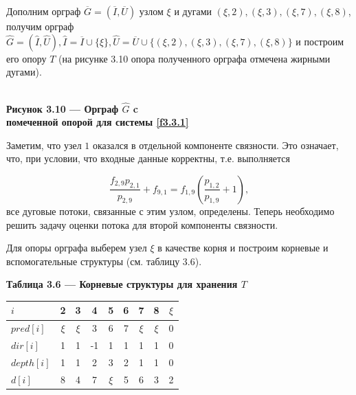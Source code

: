 \documentclass[14pt]{extarticle}%
\begin{document}
Дополним орграф $\overline{G}=(\overline{I},\overline{U})$ узлом $\xi$ и дугами $(\xi,2), (\xi,3), (\xi,7), (\xi,8)$, получим орграф $\widehat{G}=(\widehat{I}, \widehat{U}), \widehat{I}=\overline{I}\cup \{\xi\}, \widehat{U}=\overline{U}\cup \{(\xi,2), (\xi,3), (\xi,7), (\xi,8)\}$ и построим его опору $T$ (на рисунке 3.10 опора полученного орграфа отмечена жирными дугами).

\begin{center}
\\
\textbf{Рисунок 3.10 --- Орграф $\widehat{G}$ c\\помеченной опорой для системы \eqref{f3.3.1}}
\end{center}

Заметим, что узел $1$ оказался в отдельной компоненте связности. Это означает, что, при условии, что входные данные корректны, т.е. выполняется

$$
\frac{f_{2,9} p_{2,1}}{p_{2,9}}+f_{9,1}=f_{1,9} \left(\frac{p_{1,2}}{p_{1,9}}+1\right),
$$
все дуговые потоки, связанные с этим узлом, определены. Теперь необходимо решить задачу оценки потока для второй компоненты связности.

Для опоры орграфа выберем узел $\xi$ в качестве корня и построим корневые и вспомогательные структуры (см. таблицу 3.6).

\begin{center}
\textbf{Таблица 3.6 --- Корневые структуры для хранения $T$}\\
\begin{tabular}{l|cccccccc}
 $i$ &2&3&4&5&6&7&8&$\xi$\\\hline
 $pred[i]$ & $\xi$ & $\xi$ & 3 & 6 & 7 & $\xi$ & $\xi$ & 0 \\
 $dir[i]$ & 1 & 1 & -1 & 1 & 1 & 1 & 1 & 0 \\
 $depth[i]$ & 1 & 1 & 2 & 3 & 2 & 1 & 1 & 0 \\
 $d[i]$ & 8 & 4 & 7 & $\xi$ & 5 & 6 & 3 & 2  \\
\end{tabular}
\end{center}
\end{document}
